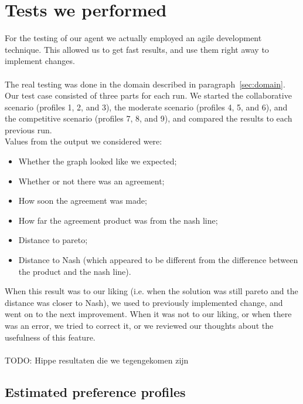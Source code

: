 \section{Tests we performed}
For the testing of our agent we actually employed an agile development technique. This allowed us to get fast results, and use them right away to implement changes.
\\\\
The real testing was done in the domain described in paragraph~\ref{sec:domain}. Our test case consisted of three parts for each run. We started the collaborative scenario (profiles 1, 2, and 3), the moderate scenario (profiles 4, 5, and 6), and the competitive scenario (profiles 7, 8, and 9), and compared the results to each previous run.
\\
Values from the output we considered were:
\begin{itemize}
\item Whether the graph looked like we expected;
\item Whether or not there was an agreement;
\item How soon the agreement was made;
\item How far the agreement product was from the nash line;
\item Distance to pareto;
\item Distance to Nash (which appeared to be different from the difference between the product and the nash line).
\end{itemize}

When this result was to our liking (i.e. when the solution was still pareto and the distance was closer to Nash), we used to previously implemented change, and went on to the next improvement. When it was not to our liking, or when there was an error, we tried to correct it, or we reviewed our thoughts about the usefulness of this feature.
\\\\
TODO: Hippe resultaten die we tegengekomen zijn

\subsection{Estimated preference profiles}


